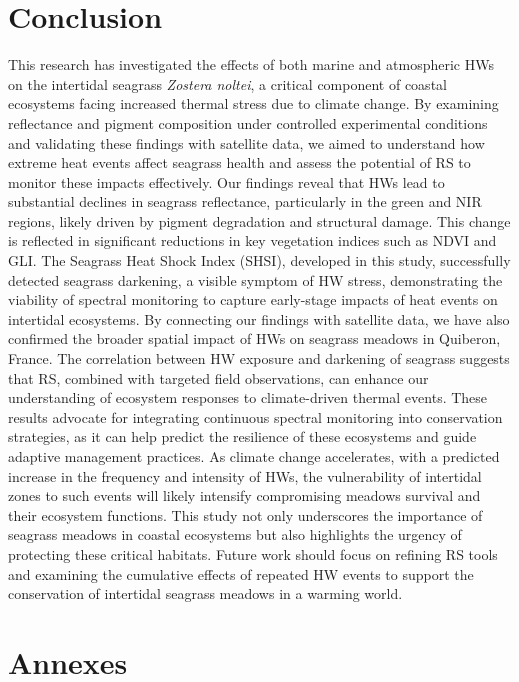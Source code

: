 \documentclass[
  letterpaper,
  11pt,
  english,
  singlespacing,
  headsepline]{MastersDoctoralThesis}
\begin{document}
\begin{spacing}{1.5}
\section{Conclusion}\label{conclusion-2}

This research has investigated the effects of both marine and
atmospheric HWs on the intertidal seagrass \emph{Zostera noltei}, a
critical component of coastal ecosystems facing increased thermal stress
due to climate change. By examining reflectance and pigment composition
under controlled experimental conditions and validating these findings
with satellite data, we aimed to understand how extreme heat events
affect seagrass health and assess the potential of RS to monitor these
impacts effectively. Our findings reveal that HWs lead to substantial
declines in seagrass reflectance, particularly in the green and NIR
regions, likely driven by pigment degradation and structural damage.
This change is reflected in significant reductions in key vegetation
indices such as NDVI and GLI. The Seagrass Heat Shock Index (SHSI),
developed in this study, successfully detected seagrass darkening, a
visible symptom of HW stress, demonstrating the viability of spectral
monitoring to capture early-stage impacts of heat events on intertidal
ecosystems. By connecting our findings with satellite data, we have also
confirmed the broader spatial impact of HWs on seagrass meadows in
Quiberon, France. The correlation between HW exposure and darkening of
seagrass suggests that RS, combined with targeted field observations,
can enhance our understanding of ecosystem responses to climate-driven
thermal events. These results advocate for integrating continuous
spectral monitoring into conservation strategies, as it can help predict
the resilience of these ecosystems and guide adaptive management
practices. As climate change accelerates, with a predicted increase in
the frequency and intensity of HWs, the vulnerability of intertidal
zones to such events will likely intensify compromising meadows survival
and their ecosystem functions. This study not only underscores the
importance of seagrass meadows in coastal ecosystems but also highlights
the urgency of protecting these critical habitats. Future work should
focus on refining RS tools and examining the cumulative effects of
repeated HW events to support the conservation of intertidal seagrass
meadows in a warming world.

\newpage

\section{Annexes}\label{annexes-1}


\end{spacing}
\end{document}
